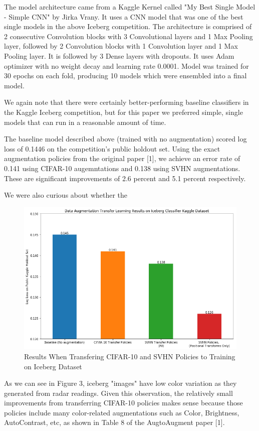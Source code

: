 \documentclass[10pt,twocolumn,letterpaper]{article}
\begin{document}
The model architecture came from a Kaggle Kernel called "My Best Single Model - Simple CNN" by Jirka Vrany.  It uses a CNN model that was one of the best single models in the above Iceberg competition. The architecture is comprised of 2 consecutive Convolution blocks with 3 Convolutional layers and 1 Max Pooling layer, followed by 2 Convolution blocks with 1 Convolution layer and 1 Max Pooling layer. It is followed by 3 Dense layers with dropouts. It uses Adam optimizer with no weight decay and learning rate 0.0001. Model was trained for 30 epochs on each fold, producing 10 models which were ensembled into a final model.  

We again note that there were certainly better-performing baseline classifiers in the Kaggle Iceberg competition, but for this paper we preferred simple, single models that can run in a reasonable amount of time. 

The baseline model described above (trained with no augmentation) scored log loss of 0.1446 on the competition's public holdout set.  Using the exact augmentation policies from the original paper [1], we achieve an error rate of 0.141 using CIFAR-10 augemntations  and 0.138 using SVHN augmentations.  These are significant improvements of 2.6 percent and 5.1 percent respectively.

We were also curious about whether the 

\begin{figure}[bhp]
\includegraphics[width=\columnwidth]{iceberg_results.png}
\caption{Results When Transfering CIFAR-10 and SVHN Policies to Training on Iceberg Dataset}
\end{figure}

As we can see in Figure 3, iceberg "images" have low color variation as they generated from radar readings. Given this observation, the relatively small improvements from transferring CIFAR-10 policies makes sense because those policies include many color-related augmentations such as Color, Brightness, AutoContrast, etc, as shown in Table 8 of the AugtoAugment paper [1].  
\end{document}
